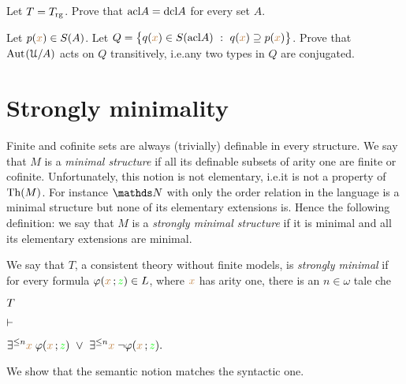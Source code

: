\begin{exercise}\label{ex_acl_rg}
  Let $T=T_{\rm rg}$.
  Prove that ${\rm acl} A={\rm dcl} A$ for every set $A$.
\end{exercise} 

\begin{exercise}\label{ex_trans_action_on_Q}
  Let $p({\color{brown} x})\in S(A)$.
  Let $Q=\big\{q({\color{brown} x})\in S({\rm acl} A)\ :\ q({\color{brown} x})\supseteq p({\color{brown} x})\big\}$.
  Prove that ${\rm Aut\kern.15ex}(\EuScript U/A)$ acts on $Q$ transitively, i.e.\@ any two types in $Q$ are conjugated.
\end{exercise}

\section{Strongly minimality\label{tfm}}%
 
\def\medrel#1{\parbox[t]{5ex}{$\displaystyle\hfil #1$}}
\def\ceq#1#2#3{\parbox{15ex}{$\displaystyle #1$}\medrel{#2}$\displaystyle  #3$}

Finite and cofinite sets are always (trivially) definable in every structure.
We say that $M$ is a \emph{minimal structure\/} if all its definable subsets of arity one are finite or cofinite.
Unfortunately, this notion is not elementary, i.e.\@ it is not a property of ${\rm Th}(M)$.
For instance $\NN$ with only the order relation in the language is a minimal structure but 
none of its elementary extensions is.
Hence the following definition: 
we say that $M$ is a \emph{strongly minimal structure\/} if it is minimal and all its elementary extensions are minimal.

We say that $T$, a consistent theory without finite models, is \emph{strongly minimal\/} if 
for every formula $\varphi({\color{brown} x}\,;{\color{green} z})\in L$, where ${\color{brown} x}$ has arity one, there is an  $n\in\omega$ tale che

\ceq{\hfill T}
{\proves}
{\E^{\le n}{\mr x}\;\phi({\mr x}\,;{\gr z})\ \vee\ \E^{\le n}{\mr x}\;\neg\phi({\mr x}\,;{\gr z}).}

We show that the semantic notion matches the syntactic one.

